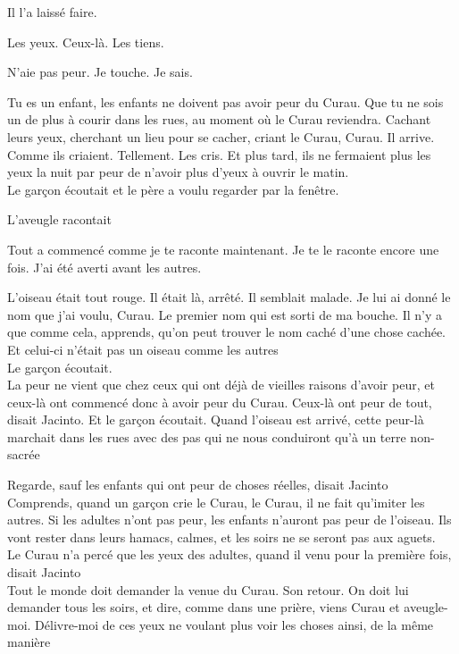 Il l'a laissé faire.

Les yeux. Ceux-là. Les tiens.

N'aie pas peur. Je touche. Je sais.

Tu es un enfant, les enfants ne doivent pas avoir peur du Curau. Que tu
ne sois un de plus à courir dans les rues, au moment où le Curau
reviendra. Cachant leurs yeux, cherchant un lieu pour se cacher, criant
le Curau, Curau. Il arrive. Comme ils criaient. Tellement. Les cris. Et
plus tard, ils ne fermaient plus les yeux la nuit par peur de n'avoir
plus d'yeux à ouvrir le matin.\\

Le garçon écoutait et le père a voulu regarder par la fenêtre.

L'aveugle racontait

Tout a commencé comme je te raconte maintenant. Je te le raconte encore
une fois. J'ai été averti avant les autres.

L'oiseau était tout rouge. Il était là, arrêté. Il semblait malade. Je
lui ai donné le nom que j'ai voulu, Curau. Le premier nom qui est sorti
de ma bouche. Il n'y a que comme cela, apprends, qu'on peut trouver le
nom caché d'une chose cachée. Et celui-ci n'était pas un oiseau comme
les autres\\

Le garçon écoutait.\\

La peur ne vient que chez ceux qui ont déjà de vieilles raisons d'avoir
peur, et ceux-là ont commencé donc à avoir peur du Curau. Ceux-là ont
peur de tout, disait Jacinto. Et le garçon écoutait. Quand l'oiseau est
arrivé, cette peur-là marchait dans les rues avec des pas qui ne nous
conduiront qu'à un terre non-sacrée

Regarde, sauf les enfants qui ont peur de choses réelles, disait Jacinto\\

Comprends, quand un garçon crie le Curau, le Curau, il ne fait qu'imiter
les autres. Si les adultes n'ont pas peur, les enfants n'auront pas peur
de l'oiseau. Ils vont rester dans leurs hamacs, calmes, et les soirs ne
se seront pas aux aguets.\\

Le Curau n'a percé que les yeux des adultes, quand il venu pour la
première fois, disait Jacinto\\

Tout le monde doit demander la venue du Curau. Son retour. On doit lui
demander tous les soirs, et dire, comme dans une prière, viens Curau et
aveugle-moi. Délivre-moi de ces yeux ne voulant plus voir les choses
ainsi, de la même manière

